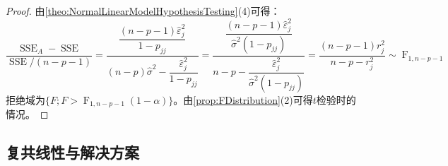 \begin{proof}
	由\cref{theo:NormalLinearModelHypothesisTesting}(4)可得：
	\begin{equation*}
		\frac{\operatorname{SSE}_A-\operatorname{SSE}}{\operatorname{SSE}/(n-p-1)}=\dfrac{\dfrac{(n-p-1)\hat{\varepsilon}_j^2}{1-p_{jj}}}{(n-p)\hat{\sigma}^2-\dfrac{\hat{\varepsilon}_j^2}{1-p_{jj}}}=\dfrac{\dfrac{(n-p-1)\hat{\varepsilon}_j^2}{\hat{\sigma}^2(1-p_{jj})}}{n-p-\dfrac{\hat{\varepsilon}_j^2}{\hat{\sigma}^2(1-p_{jj})}}=\frac{(n-p-1)r_j^2}{n-p-r_j^2}\sim\operatorname{F}_{1,n-p-1}
	\end{equation*}
	拒绝域为$\{F;F>\operatorname{F}_{1,n-p-1}(1-\alpha)\}$。由\cref{prop:FDistribution}(2)可得$t$检验时的情况。
\end{proof}

\subsection{复共线性与解决方案}
